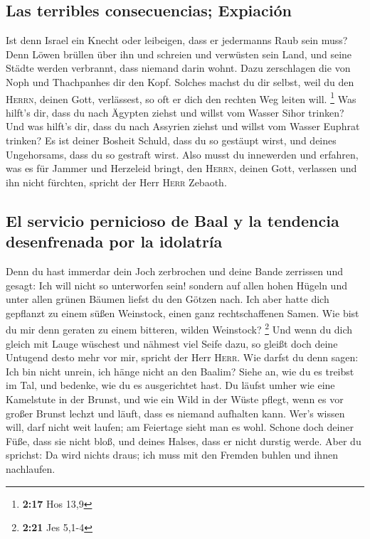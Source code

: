 \hypertarget{las-terribles-consecuencias-expiaciuxf3n}{%
\subsection{Las terribles consecuencias;
Expiación}\label{las-terribles-consecuencias-expiaciuxf3n}}

 Ist denn Israel ein Knecht oder leibeigen, dass er
jedermanns Raub sein muss?  Denn Löwen brüllen über ihn
und schreien und verwüsten sein Land, und seine Städte werden verbrannt,
dass niemand darin wohnt.  Dazu zerschlagen die von Noph
und Thachpanhes dir den Kopf.  Solches machst du dir
selbst, weil du den \textsc{Herrn}, deinen Gott, verlässest, so oft er
dich den rechten Weg leiten will. \footnote{\textbf{2:17} Hos 13,9}
 Was hilft's dir, dass du nach Ägypten ziehst und willst
vom Wasser Sihor trinken? Und was hilft's dir, dass du nach Assyrien
ziehst und willst vom Wasser Euphrat trinken?  Es ist
deiner Bosheit Schuld, dass du so gestäupt wirst, und deines
Ungehorsams, dass du so gestraft wirst. Also musst du innewerden und
erfahren, was es für Jammer und Herzeleid bringt, den \textsc{Herrn},
deinen Gott, verlassen und ihn nicht fürchten, spricht der Herr
\textsc{Herr} Zebaoth.

\hypertarget{el-servicio-pernicioso-de-baal-y-la-tendencia-desenfrenada-por-la-idolatruxeda}{%
\subsection{El servicio pernicioso de Baal y la tendencia desenfrenada
por la
idolatría}\label{el-servicio-pernicioso-de-baal-y-la-tendencia-desenfrenada-por-la-idolatruxeda}}

 Denn du hast immerdar dein Joch zerbrochen und deine
Bande zerrissen und gesagt: Ich will nicht so unterworfen sein! sondern
auf allen hohen Hügeln und unter allen grünen Bäumen liefst du den
Götzen nach.  Ich aber hatte dich gepflanzt zu einem
süßen Weinstock, einen ganz rechtschaffenen Samen. Wie bist du mir denn
geraten zu einem bitteren, wilden Weinstock? \footnote{\textbf{2:21} Jes
  5,1-4}  Und wenn du dich gleich mit Lauge wüschest und
nähmest viel Seife dazu, so gleißt doch deine Untugend desto mehr vor
mir, spricht der Herr \textsc{Herr}.  Wie darfst du denn
sagen: Ich bin nicht unrein, ich hänge nicht an den Baalim? Siehe an,
wie du es treibst im Tal, und bedenke, wie du es ausgerichtet hast.
 Du läufst umher wie eine Kamelstute in der Brunst, und
wie ein Wild in der Wüste pflegt, wenn es vor großer Brunst lechzt und
läuft, dass es niemand aufhalten kann. Wer's wissen will, darf nicht
weit laufen; am Feiertage sieht man es wohl.  Schone doch
deiner Füße, dass sie nicht bloß, und deines Halses, dass er nicht
durstig werde. Aber du sprichst: Da wird nichts draus; ich muss mit den
Fremden buhlen und ihnen nachlaufen.

